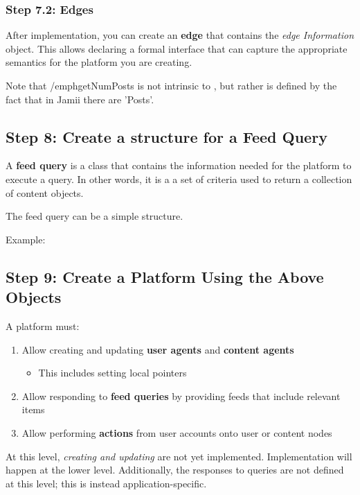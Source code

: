 \subsubsection{Step 7.2: Edges}

After implementation, you can create an \textbf{edge} that contains the \textit{edge Information} object. This allows declaring a formal interface that can capture the appropriate semantics for the platform you are creating.
\par Note that /emph{getNumPosts} is not intrinsic to \rhpc, but rather is defined by the fact that in Jamii there are 'Posts'. 



\subsection{Step 8: Create a structure for a Feed Query}
A \textbf{feed query} is a class that contains the information needed for the platform to execute a query. In other words, it is a a set of criteria used to return a collection of content objects.

The feed query can be a simple structure.
\par Example:


\subsection{Step 9: Create a Platform Using the Above Objects}

A platform must:
\begin{enumerate} 
	\item Allow creating and updating \textbf{user agents} and \textbf{content agents}
	\begin{itemize} \item This includes setting local pointers \end{itemize}
	\item Allow responding to \textbf{feed queries} by providing feeds that include relevant items
	\item Allow performing \textbf{actions} from user accounts onto user or content nodes
\end{enumerate}

At this level, \textit{creating and updating} are not yet implemented. Implementation will happen at the lower level. Additionally, the responses to queries are not defined at this level; this is instead application-specific.

